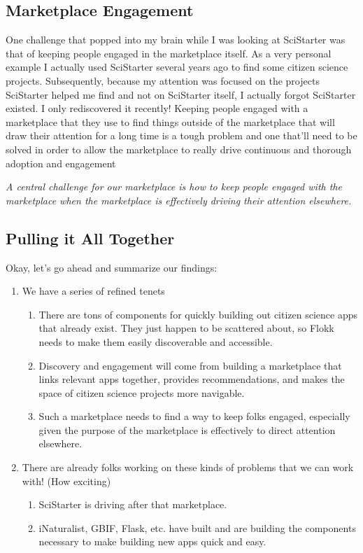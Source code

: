 \documentclass[10pt,a5paper]{book}
\begin{document}
\subsection{Marketplace Engagement}
One challenge that popped into my brain while I was looking at SciStarter was that of keeping people engaged in the marketplace itself. As a very personal example I actually used SciStarter several years ago to find some citizen science projects. Subsequently, because my attention was focused on the projects SciStarter helped me find and not on SciStarter itself, I actually forgot SciStarter existed. I only rediscovered it recently! Keeping people engaged with a marketplace that they use to find things outside of the marketplace that will draw their attention for a long time is a tough problem and one that'll need to be solved in order to allow the marketplace to really drive continuous and thorough adoption and engagement\linebreak

\textit{A central challenge for our marketplace is how to keep people engaged with the marketplace when the marketplace is effectively driving their attention elsewhere.}

\subsection{Pulling it All Together}
Okay, let's go ahead and summarize our findings:
\begin{enumerate}
\item We have a series of refined tenets
\begin{enumerate}
\item There are tons of components for quickly building out citizen science apps that already exist. They just happen to be scattered about, so Flokk needs to make them easily discoverable and accessible.
\item Discovery and engagement will come from building a marketplace that links relevant apps together, provides recommendations, and makes the space of citizen science projects more navigable.
\item Such a marketplace needs to find a way to keep folks engaged, especially given the purpose of the marketplace is effectively to direct attention elsewhere.
\end{enumerate}

\item There are already folks working on these kinds of problems that we can work with! (How exciting)
\begin{enumerate}
\item SciStarter is driving after that marketplace.
\item iNaturalist, GBIF, Flask, etc. have built and are building the components necessary to make building new apps quick and easy.
\end{enumerate}

\end{enumerate}
\end{document}
